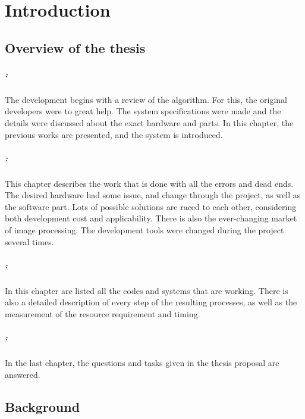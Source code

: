 \chapter{Introduction} %

\section{Overview of the thesis} %
\paragraph{: }
The development begins with a review of the algorithm.
For this, the original developers were to great help.
The system specifications were made and the details were discussed about the exact hardware and parts.
In this chapter, the previous works are presented, and the system is introduced.

\paragraph{: } 
This chapter describes the work that is done with all the errors and dead ends.
The desired hardware had some issue, and change through the project, as well as the software part.
Lots of possible solutions are raced to each other, considering both development cost and applicability.
There is also the ever-changing market of image processing.
The development tools were changed during the project several times.

\paragraph{: } 
In this chapter are listed all the codes and systems that are working.
There is also a detailed description of every step of the resulting processes, as well as the measurement of the resource requirement and timing.

\paragraph{: } 
In the last chapter, the questions and tasks given in the thesis proposal are answered.

\section{Background}
